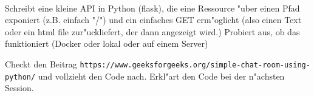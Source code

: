 \\
Schreibt eine kleine API in Python (flask), die eine Ressource "uber einen Pfad exponiert (z.B. einfach "/") und ein einfaches GET erm"oglicht (also einen Text oder ein html file zur"uckliefert, der dann angezeigt wird.)
Probiert aus, ob das funktioniert (Docker oder lokal oder auf einem Server)

Checkt den Beitrag \texttt{https://www.geeksforgeeks.org/simple-chat-room-using-python/} und vollzieht den Code nach. Erkl"art den Code bei der n"achsten Session.


